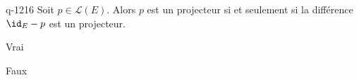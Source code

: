 \begin{truefalse}{q-1216}
Soit $p\in \mathcal{L}(E)$. Alors $p$ est un projecteur si et seulement si la différence $\id_E - p$ est un projecteur.
\item* Vrai
\item Faux
\end{truefalse}

